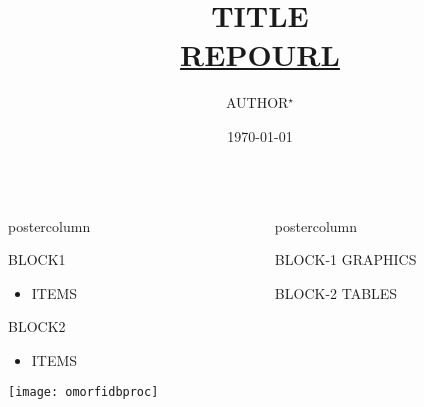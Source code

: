 \documentclass[final,hyperref={pdfpagelabels}]{beamer}
\title[SHORTTITLE]{{\huge TITLE}\\
\url{REPOURL}}
\author[EMAIL]{AUTHOR$^\star$ }
\institute[SHORTAFFILIATION]{$^\star$ AFFILIATION1,AFFILIATION2}
\date{\today}
\newlength{\columnheight}
\begin{document}
\begin{frame}
      \begin{columns}
      \begin{column}{.49\textwidth}
      \begin{beamercolorbox}[center,wd=\textwidth]{postercolumn}
          \begin{minipage}[T]{.95\textwidth}  %
          \parbox[t][\columnheight]{\textwidth}{ %
        \begin{block}{BLOCK1}
            \begin{itemize}
                \item ITEMS
            \end{itemize}
        \end{block}

        \begin{block}{BLOCK2}
            \begin{itemize}
                \item ITEMS
            \end{itemize}
            \texttt{[image: omorfidbproc]}
        \end{block}

         }
        \end{minipage}
      \end{beamercolorbox}
  \end{column}

   \begin{column}{.49\textwidth}
      \begin{beamercolorbox}[center,wd=\textwidth]{postercolumn}
        \begin{minipage}[T]{.95\textwidth} %
          \parbox[t][\columnheight]{\textwidth}{ %

        \begin{block}{BLOCK-1}
            GRAPHICS
        \end{block}

        \begin{block}{BLOCK-2}
            TABLES
        \end{block}

         }
        \end{minipage}
      \end{beamercolorbox}
    \end{column}
  \end{columns}

  \end{frame}
\end{document}
